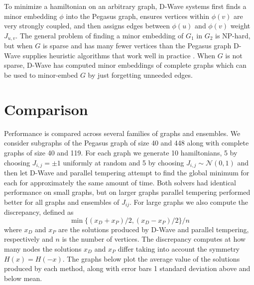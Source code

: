 \documentclass[12pt]{article}
\newcommand{\1}{\mathbf{1}}
\theoremstyle{remark}
\theoremstyle{definition}
\theoremstyle{proposition}
\theoremstyle{lemma}
\theoremstyle{definition}
\begin{document}
	To minimize a hamiltonian on an arbitrary graph, D-Wave systems first finds a minor embedding $\phi$ into the Pegasus graph, ensures vertices within $\phi(v)$ are very strongly coupled, and then assigns edges between $\phi(u)$ and $\phi(v)$ weight $J_{u, v}$. The general problem of finding a minor embedding of $G_1$ in $G_2$ is NP-hard, but when $G$ is sparse and has many fewer vertices than the Pegasus graph D-Wave supplies heuristic algorithms that work well in practice \cite{cai2014practical}. When $G$ is not sparse, D-Wave has computed minor embeddings of complete graphs which can be used to minor-embed $G$ by just forgetting unneeded edges.
	
	\section{Comparison}
	\indent \indent Performance is compared across several families of graphs and ensembles. We consider subgraphs of the Pegasus graph of size 40 and 448 along with complete graphs of size 40 and 119. For each graph we generate 10 hamiltonians, 5 by choosing $J_{i, j} = \pm 1$ uniformly at random and 5 by choosing $J_{i, j} \sim \mathcal{N}(0, 1)$ and then let D-Wave and parallel tempering attempt to find the global minimum for each for approximately the same amount of time. Both solvers had identical performance on small graphs, but on larger graphs parallel tempering performed better for all graphs and ensembles of $J_{ij}$. For large graphs we also compute the discrepancy, defined as
	$$\min \{(x_D + x_P)/2, (x_D - x_P)/2\} / n$$
	where $x_D$ and $x_P$  are the solutions produced by D-Wave and parallel tempering, respectively and $n$ is the number of vertices. The discrepancy computes at how many nodes the solutions $x_D$ and $x_P$ differ taking into account the symmetry $H(x) = H(-x)$. The graphs below plot the average value of the solutions produced by each method, along with error bars 1 standard deviation above and below mean.
\end{document}
